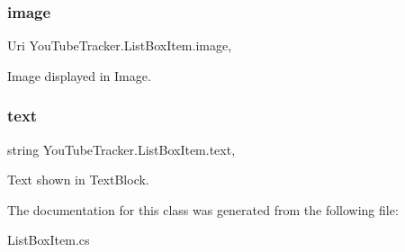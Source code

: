 \subsubsection{\texorpdfstring{image}{image}}
{\footnotesize\ttfamily Uri You\+Tube\+Tracker.\+List\+Box\+Item.\+image\hspace{0.3cm}{\ttfamily [get]}, {\ttfamily [set]}}



Image displayed in Image. 

\mbox{\label{class_you_tube_tracker_1_1_list_box_item_a39c781719df70576a81d8c16a524f946}} 
\subsubsection{\texorpdfstring{text}{text}}
{\footnotesize\ttfamily string You\+Tube\+Tracker.\+List\+Box\+Item.\+text\hspace{0.3cm}{\ttfamily [get]}, {\ttfamily [set]}}



Text shown in Text\+Block. 



The documentation for this class was generated from the following file\+:\begin{DoxyCompactItemize}
\item 
List\+Box\+Item.\+cs\end{DoxyCompactItemize}

